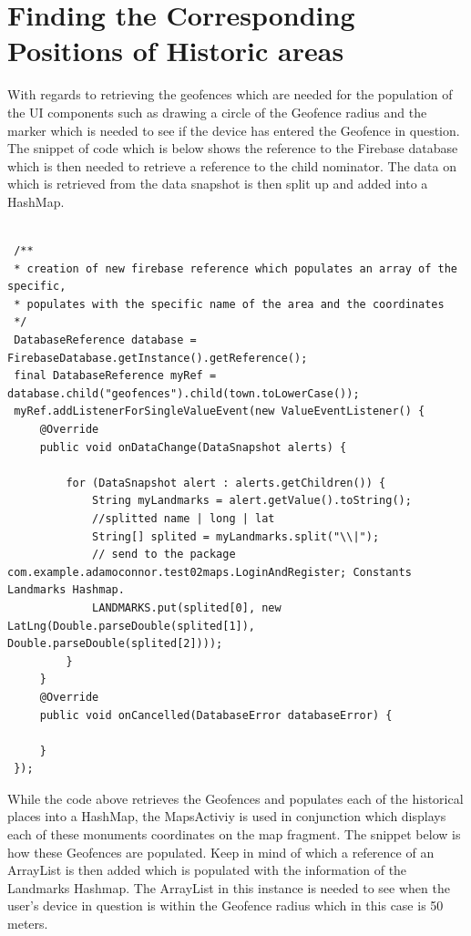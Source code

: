 \section{Finding the Corresponding Positions of Historic areas}
With regards to retrieving the geofences which are needed for the population of the UI components such as drawing a circle of the Geofence radius and the marker which is needed to see if the device has entered the Geofence in question. The snippet of code which is below shows the reference to the Firebase database which is then needed to retrieve a reference to the child nominator. The data on which is retrieved from the data snapshot is then split up and added into a HashMap.

\begin{lstlisting}[style=myCustomMatlabStyle, basicstyle=\small, breaklines, caption=Reteriving text Information of Monument,captionpos=b]

 /**
 * creation of new firebase reference which populates an array of the specific,
 * populates with the specific name of the area and the coordinates
 */
 DatabaseReference database = FirebaseDatabase.getInstance().getReference();
 final DatabaseReference myRef = database.child("geofences").child(town.toLowerCase());
 myRef.addListenerForSingleValueEvent(new ValueEventListener() {
     @Override
     public void onDataChange(DataSnapshot alerts) {
         
         for (DataSnapshot alert : alerts.getChildren()) {
             String myLandmarks = alert.getValue().toString();
             //splitted name | long | lat
             String[] splited = myLandmarks.split("\\|");
             // send to the package com.example.adamoconnor.test02maps.LoginAndRegister; Constants Landmarks Hashmap.
             LANDMARKS.put(splited[0], new LatLng(Double.parseDouble(splited[1]), Double.parseDouble(splited[2])));
         }
     }
     @Override
     public void onCancelled(DatabaseError databaseError) {
         
     }
 });
 \end{lstlisting}
 \par
 While the code above retrieves the Geofences and populates each of the historical places into a HashMap, the MapsActiviy is used in conjunction which displays each of these monuments coordinates on the map fragment. The snippet below is how these Geofences are populated. Keep in mind of which a reference of an ArrayList is then added which is populated with the information of the Landmarks Hashmap. The ArrayList in this instance is needed to see when the user's device in question is within the Geofence radius which in this case is 50 meters.
 
